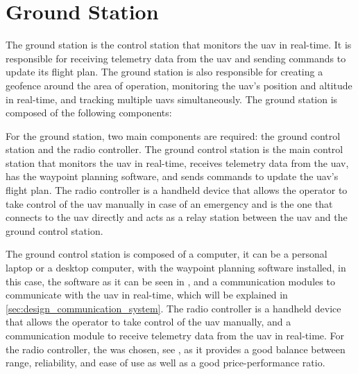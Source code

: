 \section{Ground Station}\label{sec:design_ground_station}

The ground station is the control station that monitors the \gls{uav} in real-time. It is responsible for receiving telemetry data from the \gls{uav} and sending commands to update its flight plan. The ground station is also responsible for creating a geofence around the area of operation, monitoring the \gls{uav}'s position and altitude in real-time, and tracking multiple \glspl{uav} simultaneously. The ground station is composed of the following components:

For the ground station, two main components are required: the ground control station and the radio controller. The ground control station is the main control station that monitors the \gls{uav} in real-time, receives telemetry data from the \gls{uav}, has the waypoint planning software, and sends commands to update the \gls{uav}'s flight plan. The radio controller is a handheld device that allows the operator to take control of the \gls{uav} manually in case of an emergency and is the one that connects to the \gls{uav} directly and acts as a relay station between the \gls{uav} and the ground control station.

The ground control station is composed of a computer, it can be a personal laptop or a desktop computer, with the waypoint planning software installed, in this case, the  software as it can be seen in , and a communication modules to communicate with the \gls{uav} in real-time, which will be explained in \cref{sec:design_communication_system}. The radio controller is a handheld device that allows the operator to take control of the \gls{uav} manually, and a communication module to receive telemetry data from the \gls{uav} in real-time. For the radio controller, the  was chosen, see , as it provides a good balance between range, reliability, and ease of use as well as a good price-performance ratio.


